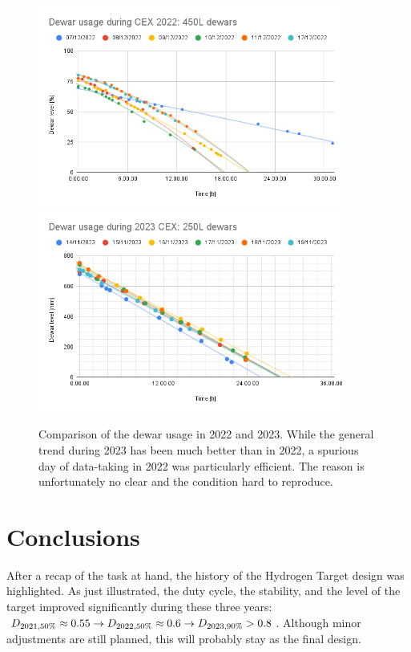 \begin{refsection}
        \begin{figure}
            \centering
            \includegraphics[width=0.9\textwidth, keepaspectratio]{Figures/LH2/2022/CEX2022_dewars.png}
            \includegraphics[width=0.9\textwidth, keepaspectratio]{Figures/LH2/2023/2023CEX_dewars.png}
            \caption[Dewar usage in 2022 and 2023.]{Comparison of the dewar usage in 2022 and 2023. While the general trend during 2023 has been much better than in 2022, a spurious day of data-taking in 2022 was particularly efficient. The reason is unfortunately no clear and the condition hard to reproduce.}
            \label{fig:CEX:dewar}
        \end{figure}

\section{Conclusions}
    After a recap of the task at hand, the history of the Hydrogen Target design was highlighted. As just illustrated, the duty cycle, the stability, and the level of the target improved significantly during these three years: $D_{2021, 50\%}\approx 0.55 \rightarrow D_{2022, 50\%}\approx0.6 \rightarrow D_{2023, 90\%}>0.8$. Although minor adjustments are still planned, this will probably stay as the final design.\\



\end{refsection}

